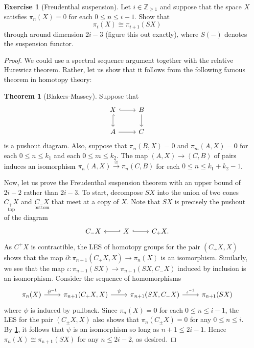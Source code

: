 \documentclass[10pt,letterpaper,cm]{nupset}
\theoremstyle{definition}
\theoremstyle{theorem}
\newtheorem{theorem}[defn]{Theorem}
\newtheorem{exercise}[defn]{Exercise}
\theoremstyle{remark}
\newcommand{\Z}{\mathbb Z}
\newcommand{\1}{\mathbb{1}}
\newcommand{\0}{\vec 0}
\begin{document}
\begin{exercise}[Freudenthal suspension]
Let $i \in \Z_{\geq 1}$ and suppose that the space $X$ satisfies $\pi_n(X) =0$ for each $0\leq n \leq i-1$. Show that $$\pi_i(X) \cong \pi_{i+1}(S{X})$$ through around dimension $2i-3$ (figure this out exactly), where $S({-})$ denotes the suspension functor.
\end{exercise}
\begin{proof}
We could use a spectral sequence argument together with the relative Hurewicz theorem. Rather, let us show that it follows from the following famous theorem in homotopy theory:
\begin{theorem}[Blakers-Massey]\label{BM}
Suppose that 
\[
\begin{tikzcd}
X \arrow[d, hook] \arrow[r, hook] & B \arrow[d] \\
A \arrow[r]                        & C          
\end{tikzcd}
\] is a pushout diagram. Also, suppose that $\pi_n(B, X)=0$ and $\pi_m(A, X)=0$ for each $0\leq n \leq k_1$ and each $0\leq m \leq k_2$. The map $\left(A, X\right) \to \left(C, B\right)$ of pairs induces an isomorphism $\pi_n(A, X) \overset{\cong}{\longrightarrow} \pi_n(C, B)$ for each $0 \leq n \leq k_1 + k_2 -1$.
\end{theorem}
Now, let us prove the Freudenthal suspension theorem with an upper bound of $2i-2$ rather than $2i-3$. To start, decompose $S{X}$ into the union of two cones $\underset{\text{top}}{C_+{X}}$ and $\underset{\text{bottom}}{C_{-}{X}}$ that meet at a copy of $X$. Note that $S{X}$ is precisely the pushout of the diagram
\[
\begin{tikzcd}
C_{-}{X} & X \arrow[l, hook'] \arrow[r, hook] & C_{+}{X}.
\end{tikzcd}
\]
As $C^+{X}$ is contractible, the LES of homotopy groups for the pair  $\left(C_{+}{X},X\right)$ shows that the map $\partial : \pi_{n+1}(C_{+}{X}, X) \to \pi_n(X)$ is an isomorphism. Similarly, we see that the map $\iota : \pi_{n+1}(S{X}) \to \pi_{n+1}(S{X}, C_{-}{X})$ induced by inclusion is an isomorphism.  Consider the sequence of homomorphisms
\[
\begin{tikzcd}
\pi_n(X) \arrow[r, "\partial^{-1}"] & {\pi_{n+1}(C_{+}{X},X)} \arrow[r, "\psi"] & {\pi_{n+1}(S{X}, C_{-}{X})} \arrow[r, "\iota^{-1}"] & \pi_{n+1}(S{X})
\end{tikzcd}
\]
where $\psi$ is induced by pullback. Since $\pi_n(X) =0$ for each $0\leq n \leq i-1$, the LES for the pair $\left(C_{\pm}{X}, X\right)$ also  shows that $\pi_n(C_{\pm}{X}) =0$ for any $0 \leq n \leq i$. By \cref{BM}, it follows that $\psi$ is an isomorphism so long as $n+1 \leq 2i-1$. Hence $\pi_n(X) \cong \pi_{n+1}(S{X})$ for any $n \leq 2i-2$, as desired.


\end{proof}
\end{document}
